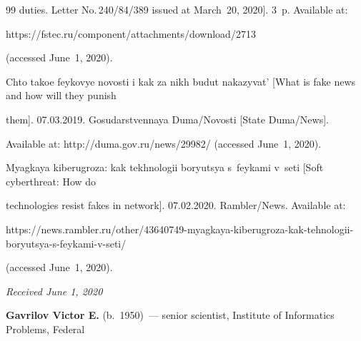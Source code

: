 {{\begin{thebibliography}{99}
duties. Letter No.\,240/84/389 issued at March~20, 2020]. 3~p. Available at: {\sf 


https://fstec.ru/component/attachments/download/2713} (accessed June~1, 2020).







Chto takoe feykovye novosti i kak za nikh budut nakazyvat' [What is fake news and how will they punish 


them]. 07.03.2019. Gosudarstvennaya Duma\!/\!Novosti [State Duma\!/\!News].


Available at: {\sf http://duma.gov.ru/news/29982/} (accessed June~1, 2020). 




Myagkaya kiberugroza: kak tekhnologii boryutsya s~feykami v~seti [Soft cyberthreat: How do 


technologies resist fakes in network]. 07.02.2020. Rambler\!/\!News. Available at: {\sf  


 https://news.rambler.ru/other/43640749-myagkaya-kiberugroza-kak-tehnologii-boryutsya-s-feykami-v-seti/} 


(accessed June~1, 2020).











\end{thebibliography}


} }










\hfill{\small\textit{Received June 1, 2020}} 










\Contr





\noindent


\textbf{Gavrilov Victor E.} (b.\ 1950)~--- senior scientist, Institute of Informatics Problems, Federal 


